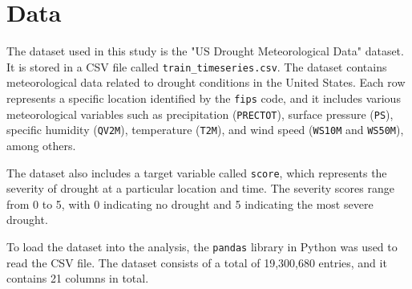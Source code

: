 \documentclass{article}
\begin{document}
\section{Data}

The dataset used in this study is the "US Drought Meteorological Data" dataset. It is stored in a CSV file called \texttt{train\_timeseries.csv}. The dataset contains meteorological data related to drought conditions in the United States. Each row represents a specific location identified by the \texttt{fips} code, and it includes various meteorological variables such as precipitation (\texttt{PRECTOT}), surface pressure (\texttt{PS}), specific humidity (\texttt{QV2M}), temperature (\texttt{T2M}), and wind speed (\texttt{WS10M} and \texttt{WS50M}), among others.

The dataset also includes a target variable called \texttt{score}, which represents the severity of drought at a particular location and time. The severity scores range from 0 to 5, with 0 indicating no drought and 5 indicating the most severe drought.

To load the dataset into the analysis, the \texttt{pandas} library in Python was used to read the CSV file. The dataset consists of a total of 19,300,680 entries, and it contains 21 columns in total.
\end{document}

